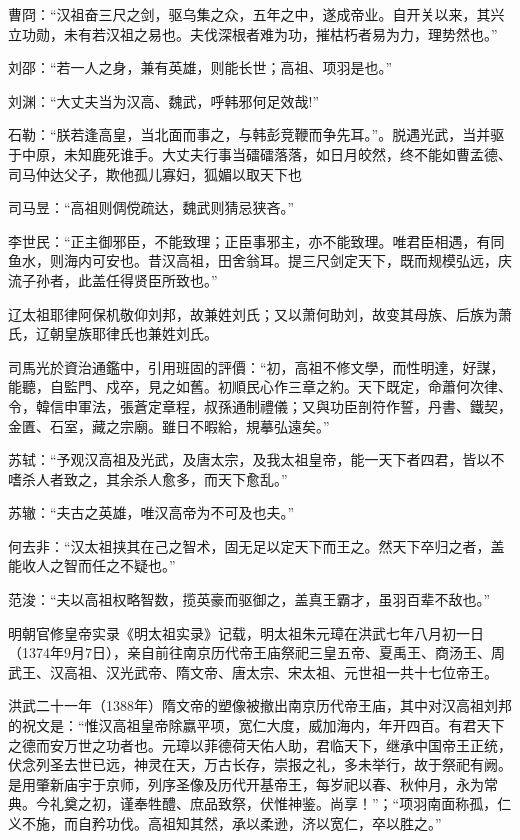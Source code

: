 曹冏：“汉祖奋三尺之剑，驱乌集之众，五年之中，遂成帝业。自开关以来，其兴立功勋，未有若汉祖之易也。夫伐深根者难为功，摧枯朽者易为力，理势然也。”

刘邵：“若一人之身，兼有英雄，则能长世；高祖、项羽是也。”

刘渊：“大丈夫当为汉高、魏武，呼韩邪何足效哉!”

石勒：“朕若逢高皇，当北面而事之，与韩彭竞鞭而争先耳。”。脱遇光武，当并驱于中原，未知鹿死谁手。大丈夫行事当礌礌落落，如日月皎然，终不能如曹孟德、司马仲达父子，欺他孤儿寡妇，狐媚以取天下也

司马昱：“高祖则倜傥疏达，魏武则猜忌狭吝。”

李世民：“正主御邪臣，不能致理；正臣事邪主，亦不能致理。唯君臣相遇，有同鱼水，则海内可安也。昔汉高祖，田舍翁耳。提三尺剑定天下，既而规模弘远，庆流子孙者，此盖任得贤臣所致也。”

辽太祖耶律阿保机敬仰刘邦，故兼姓刘氏；又以萧何助刘，故变其母族、后族为萧氏，辽朝皇族耶律氏也兼姓刘氏。

司馬光於資治通鑑中，引用班固的評價：“初，高祖不修文學，而性明達，好謀，能聽，自監門、戍卒，見之如舊。初順民心作三章之約。天下既定，命蕭何次律、令，韓信申軍法，張蒼定章程，叔孫通制禮儀；又與功臣剖符作誓，丹書、鐵契，金匱、石室，藏之宗廟。雖日不暇給，規摹弘遠矣。”

苏轼：“予观汉高祖及光武，及唐太宗，及我太祖皇帝，能一天下者四君，皆以不嗜杀人者致之，其余杀人愈多，而天下愈乱。”

苏辙：“夫古之英雄，唯汉高帝为不可及也夫。”

何去非：“汉太祖挟其在己之智术，固无足以定天下而王之。然天下卒归之者，盖能收人之智而任之不疑也。”

范浚：“夫以高祖权略智数，揽英豪而驱御之，盖真王霸才，虽羽百辈不敌也。”

明朝官修皇帝实录《明太祖实录》记载，明太祖朱元璋在洪武七年八月初一日（1374年9月7日），亲自前往南京历代帝王庙祭祀三皇五帝、夏禹王、商汤王、周武王、汉高祖、汉光武帝、隋文帝、唐太宗、宋太祖、元世祖一共十七位帝王。

洪武二十一年（1388年）隋文帝的塑像被撤出南京历代帝王庙，其中对汉高祖刘邦的祝文是：“惟汉高祖皇帝除嬴平项，宽仁大度，威加海内，年开四百。有君天下之德而安万世之功者也。元璋以菲德荷天佑人助，君临天下，继承中国帝王正统，伏念列圣去世已远，神灵在天，万古长存，崇报之礼，多未举行，故于祭祀有阙。是用肇新庙宇于京师，列序圣像及历代开基帝王，每岁祀以春、秋仲月，永为常典。今礼奠之初，谨奉牲醴、庶品致祭，伏惟神鉴。尚享！”；“项羽南面称孤，仁义不施，而自矜功伐。高祖知其然，承以柔逊，济以宽仁，卒以胜之。”

